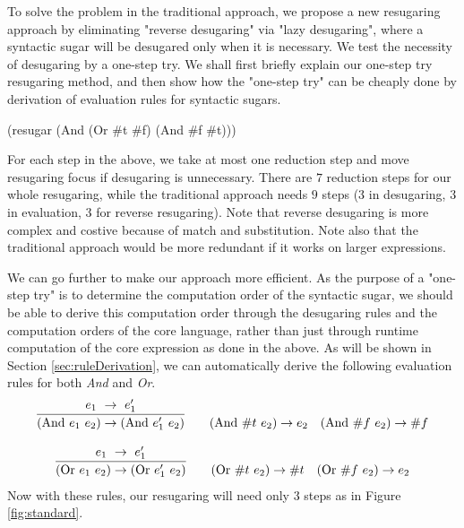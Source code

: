 To solve the problem in the traditional approach, we propose a new resugaring approach by eliminating "reverse desugaring" via "lazy desugaring", where a syntactic sugar will be desugared only when it is necessary. We test the necessity of desugaring by a one-step try. We shall first briefly explain our one-step try resugaring method, and then show how the "one-step try" can be cheaply done by derivation of evaluation rules for syntactic sugars.
\begin{Codes}
    (resugar (And (Or \#t \#f) (And \#f \#t)))
 
 
\end{Codes}

For each step in the above, we take at most one reduction step and move resugaring focus if desugaring is unnecessary. There are $7$ reduction steps for our whole resugaring, while the traditional approach needs $9$ steps ($3$ in desugaring, $3$ in evaluation, $3$ for reverse resugaring). Note that reverse desugaring is more complex and costive because of match and substitution. Note also that the traditional approach would be more redundant if it works on larger expressions.

We can go further to make our approach more efficient. As the purpose of a "one-step try" is to determine the computation order of the syntactic sugar, we should be able to derive this computation order through the desugaring rules and the computation orders of the core language, rather than just through runtime computation of the core expression as done in the above. As will be shown in Section \ref{sec:ruleDerivation}, we can automatically derive the following evaluation rules for both \emph{And} and \emph{Or}.
\[
\begin{array}{c}
\infer {(\mbox{And}~e_1~e_2) \rightarrow (\mbox{And}~e_1'~e_2)} {e_1~ \rightarrow~e_1'}
\qquad
(\mbox{And}~\#t~e_2) \rightarrow e_2
\quad
(\mbox{And}~\#f~e_2) \rightarrow \#f \\
\\
\infer {(\mbox{Or}~e_1~e_2) \rightarrow (\mbox{Or}~e_1'~e_2)} {e_1~ \rightarrow~e_1'}
\qquad
(\mbox{Or}~\#t~e_2) \rightarrow \#t
\quad
(\mbox{Or}~\#f~e_2) \rightarrow e_2 \\
\end{array}
\]
Now with these rules, our resugaring will need only $3$ steps as in Figure \ref{fig:standard}.

